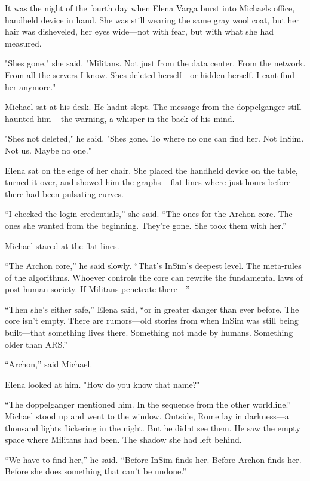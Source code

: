 \documentclass[
]{article}
\begin{document}
It was the night of the fourth day when Elena Varga burst into Michael\textquotesingle s office, handheld device in hand. She was still wearing the same gray wool coat, but her hair was disheveled, her eyes wide---not with fear, but with what she had measured.

"She\textquotesingle s gone," she said. "Militans. Not just from the data center. From the network. From all the servers I know. She\textquotesingle s deleted herself---or hidden herself. I can\textquotesingle t find her anymore."

Michael sat at his desk. He hadn\textquotesingle t slept. The message from the doppelganger still haunted him -- the warning, a whisper in the back of his mind.

"She\textquotesingle s not deleted," he said. "She\textquotesingle s gone. To where no one can find her. Not InSim. Not us. Maybe no one."

Elena sat on the edge of her chair. She placed the handheld device on the table, turned it over, and showed him the graphs -- flat lines where just hours before there had been pulsating curves.

``I checked the login credentials,'' she said. ``The ones for the Archon core. The ones she wanted from the beginning. They're gone. She took them with her.''

Michael stared at the flat lines.

``The Archon core,'' he said slowly. ``That's InSim's deepest level. The meta-rules of the algorithms. Whoever controls the core can rewrite the fundamental laws of post-human society. If Militans penetrate there---''

``Then she's either safe,'' Elena said, ``or in greater danger than ever before. The core isn't empty. There are rumors---old stories from when InSim was still being built---that something lives there. Something not made by humans. Something older than ARS.''

``Archon,'' said Michael.

Elena looked at him. "How do you know that name?"

``The doppelganger mentioned him. In the sequence from the other worldline.'' Michael stood up and went to the window. Outside, Rome lay in darkness---a thousand lights flickering in the night. But he didn\textquotesingle t see them. He saw the empty space where Militans had been. The shadow she had left behind.

``We have to find her,'' he said. ``Before InSim finds her. Before Archon finds her. Before she does something that can't be undone.''
\end{document}
